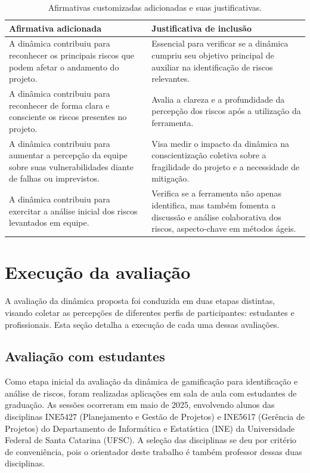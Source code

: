\documentclass[
	12pt,
	openright,
	twoside,
	a4paper,
	english,
	brazil
	]{abntex2}
\begin{document}
\begin{table}[H]
  \centering
  \caption{Afirmativas customizadas adicionadas e suas justificativas.}
  \label{tab:afirmativas-adicionadas}
  \begin{tabular}{|p{}|p{}|}
  \hline
  \textbf{Afirmativa adicionada} & \textbf{Justificativa de inclusão} \\ \hline
  A dinâmica contribuiu para reconhecer os principais riscos que podem afetar o andamento do projeto. & Essencial para verificar se a dinâmica cumpriu seu objetivo principal de auxiliar na identificação de riscos relevantes. \\ \hline
  A dinâmica contribuiu para reconhecer de forma clara e consciente os riscos presentes no projeto. & Avalia a clareza e a profundidade da percepção dos riscos após a utilização da ferramenta. \\ \hline
  A dinâmica contribuiu para aumentar a percepção da equipe sobre suas vulnerabilidades diante de falhas ou imprevistos. & Visa medir o impacto da dinâmica na conscientização coletiva sobre a fragilidade do projeto e a necessidade de mitigação. \\ \hline
  A dinâmica contribuiu para exercitar a análise inicial dos riscos levantados em equipe. & Verifica se a ferramenta não apenas identifica, mas também fomenta a discussão e análise colaborativa dos riscos, aspecto-chave em métodos ágeis. \\ \hline
  \end{tabular}
\end{table}

\section{Execução da avaliação}

A avaliação da dinâmica proposta foi conduzida em duas etapas distintas, visando coletar as percepções de diferentes perfis de participantes: estudantes e profissionais. Esta seção detalha a execução de cada uma dessas avaliações.

\subsection{Avaliação com estudantes}

Como etapa inicial da avaliação da dinâmica de gamificação para identificação e análise de riscos, foram realizadas aplicações em sala de aula com estudantes de graduação. As sessões ocorreram em maio de 2025, envolvendo alunos das disciplinas INE5427 (Planejamento e Gestão de Projetos) e INE5617 (Gerência de Projetos) do Departamento de Informática e Estatística (INE) da Universidade Federal de Santa Catarina (UFSC). A seleção das disciplinas se deu por critério de conveniência, pois o orientador deste trabalho é também professor dessas duas disciplinas.
\end{document}
